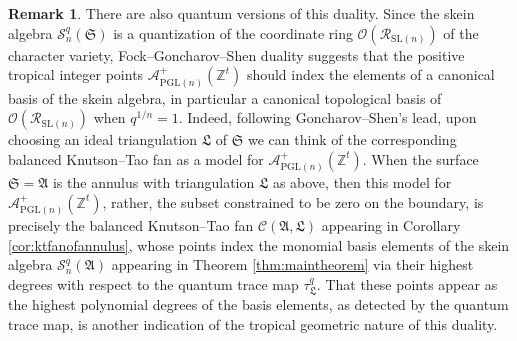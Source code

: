 \documentclass[12pt,
	]{amsart}
\theoremstyle{definition}
\newtheorem{remark}[theorem]{Remark}
\newcommand{\mrm}[1]{\mathrm{#1}}
\newcommand{\mbb}[1]{\mathbb{#1}}
\newcommand{\mcal}[1]{\mathcal{#1}}
\newcommand{\mfrak}[1]{\mathfrak{#1}}
\newcommand{\Z}{\mbb{Z}}
\newcommand{\nsl}{\mrm{SL}(n)}
\newcommand{\pngl}{\mrm{PGL}(n)}
\newcommand{\sk}{\mcal{S}_n^q}
\newcommand{\ann}{\mfrak{A}}
\newcommand{\surf}{\mfrak{S}}
\newcommand{\qroot}{q^{1/n}}
\newcommand{\idealtriang}{\mfrak{L}}
\newcommand{\qtr}{\tau^q_\idealtriang}
\newcommand{\fan}{\mcal{C}}
\begin{document}
\begin{remark}
There are also quantum versions of this duality.  Since the skein algebra $\sk(\surf)$ is a quantization of the coordinate ring $\mcal{O}(\mcal{R}_{\nsl})$ of the character variety, Fock--Goncharov--Shen duality suggests that the positive tropical integer points $\mcal{A}^+_{\pngl}(\Z^t)$ should index the elements of a canonical basis of the skein algebra, in particular a canonical topological basis of $\mcal{O}(\mcal{R}_{\nsl})$ when $\qroot=1$.  Indeed, following Goncharov--Shen's lead, upon choosing an ideal triangulation $\idealtriang$ of $\surf$ we can think of the corresponding balanced Knutson--Tao fan  as a model for $\mcal{A}^+_{\pngl}(\Z^t)$.  When the surface $\surf=\ann$ is the annulus with triangulation $\idealtriang$ as above, then this model for $\mcal{A}^+_{\pngl}(\Z^t)$, rather, the subset constrained to be zero on the boundary, is precisely the balanced Knutson--Tao fan $\fan(\ann,\idealtriang)$ appearing in Corollary \ref{cor:ktfanofannulus}, whose points index the monomial basis elements of the skein algebra $\sk(\ann)$ appearing in Theorem \ref{thm:maintheorem} via their highest degrees with respect to the quantum trace map $\qtr$.  That these points appear as the highest polynomial degrees of the basis elements, as detected by the quantum trace map, is another  indication of the tropical geometric nature of this duality. 
\end{remark}

 

\end{document}

